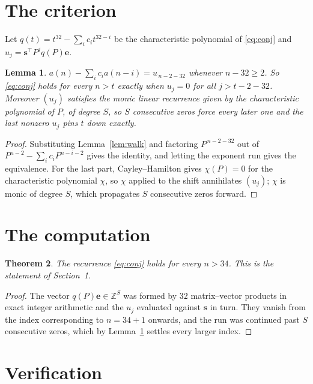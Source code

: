 \documentclass[11pt,a4paper]{article}
\theoremstyle{plain}
\newtheorem{theorem}{Theorem}
\newtheorem{lemma}[theorem]{Lemma}
\theoremstyle{definition}
\begin{document}
\section{The criterion}

Let $q(t)=t^{32}-\sum_i c_i t^{32-i}$ be the characteristic polynomial of
\eqref{eq:conj} and $u_j=\mathbf{s}^{\!\top}P^{j}q(P)\mathbf{e}$.

\begin{lemma}\label{lem:crit}
$a(n)-\sum_i c_i a(n-i)=u_{\,n-2-32}$ whenever $n-32\ge2$. So \eqref{eq:conj}
holds for every $n>t$ exactly when $u_j=0$ for all $j>t-2-32$. Moreover $(u_j)$
satisfies the monic linear recurrence given by the characteristic polynomial of $P$, of
degree $S$, so $S$ consecutive zeros force every later one and the last nonzero $u_j$ pins
$t$ down exactly.
\end{lemma}

\begin{proof}
Substituting Lemma~\ref{lem:walk} and factoring $P^{\,n-2-32}$ out of
$P^{n-2}-\sum_i c_i P^{n-i-2}$ gives the identity, and letting the exponent run gives the
equivalence. For the last part, Cayley--Hamilton gives $\chi(P)=0$ for the characteristic
polynomial $\chi$, so $\chi$ applied to the shift annihilates $(u_j)$; $\chi$ is monic of
degree $S$, which propagates $S$ consecutive zeros forward.
\end{proof}

\section{The computation}

\begin{theorem}
The recurrence \eqref{eq:conj} holds for every $n>34$. This is the statement of
Section~1.
\end{theorem}

\begin{proof}
The vector $q(P)\mathbf{e}\in\mathbb{Z}^{S}$ was formed by $32$ matrix--vector
products in exact integer arithmetic and the $u_j$ evaluated against $\mathbf{s}$ in turn.
They vanish from the index corresponding to $n=34+1$ onwards, and the run was continued
past $S$ consecutive zeros, which by Lemma~\ref{lem:crit} settles every larger index.
\end{proof}

\section{Verification}
\end{document}
